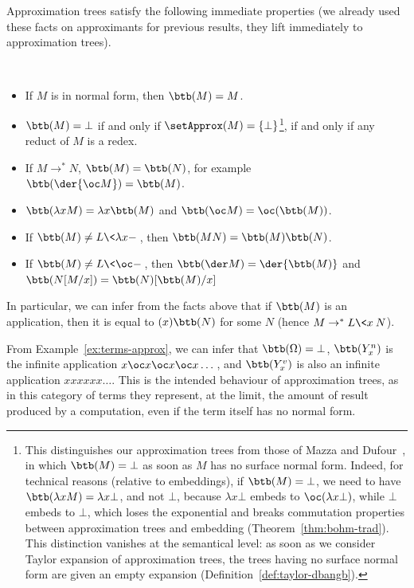 Approximation trees satisfy the following immediate properties (we already used these facts on approximants for previous results, they lift immediately to approximation trees).
\begin{proposition}\label{prop:bohm-properties}~
	\begin{itemize}
		\item If $M$ is in normal form, then $\btb(M)=M$.
		\item $\btb(M)=\bot$ if and only if
			$\setApprox(M)=\{\bot\}$\footnote{
				This distinguishes our approximation trees from those of
				Mazza and Dufour~\cite{mazza-dufour}, in which
				$\btb(M)=\bot$ as soon as $M$ has no surface
				normal form. Indeed, for technical reasons
				(relative to \cbv{}
				embeddings), if $\btb(M)=\bot$,
				we need to have $\btb(\lambda xM)=\lambda
				x\bot$, and not $\bot$, because $\lambda x\bot$
				embeds to $\oc(\lambda x\bot)$, while $\bot$
				embeds to $\bot$, which loses the exponential
				and breaks commutation properties between approximation
				trees and \cbv{} embedding
				(Theorem~\ref{thm:bohm-trad}). This distinction
				vanishes at the semantical level: as soon as we
				consider Taylor expansion of approximation trees, the
				trees having no surface normal form are given an
				empty expansion
				(Definition~\ref{def:taylor-dbangb}).
			}, if and only if any reduct of $M$ is a redex.
		\item If $M\to^*N$, $\btb(M)=\btb(N)$, for example
		 $\btb(\der{\oc M})=\btb(M)$.
		\item $\btb(\lambda xM)=\lambda x\btb(M)$ and $\btb(\oc M)=\oc(\btb(M))$.
		\item If $\btb(M)\neq L\<\lambda x-\>$, then
			$\btb(MN)=\btb(M)\btb(N)$.
		\item If $\btb(M)\neq L\<\oc-\>$, then $\btb(\der M)=\der{\btb(M)}$ and
			$\btb(N[M/x])=\btb(N)[\btb(M)/x]$
	\end{itemize}
\end{proposition}
In particular, we can infer from the facts above that if $\btb(M)$ is an application, then
it is equal to $(x)\btb(N)$ for some $N$ (hence $M\to^*L\<x\>N$).

\begin{example}\label{ex:terms-bt}
	From Example~\ref{ex:terms-approx}, we can infer that
	$\btb(\Omega)=\bot$, $\btb(Y^n_x)$ is the infinite application $x\oc
	x\oc x\oc x\dots $, and $\btb(Y^v_x)$ is also an infinite application
	$xxxxxx\dots $. This is the intended behaviour of approximation trees, as in this
	category of terms they represent, at the limit, the amount of result
	produced by a computation, even if the term itself has no normal form.
\end{example}

